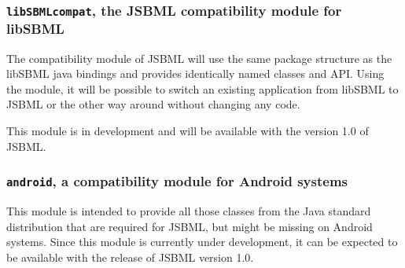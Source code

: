 \subsubsection{\texttt{libSBMLcompat}, the JSBML compatibility module for
libSBML}

The compatibility module of JSBML will use the same package structure as the
libSBML java bindings and provides identically named classes and API. Using the
module, it will be possible to switch an existing application from libSBML to
JSBML or the other way around without changing any code.

This module is in development and will be available with the version 1.0 of
JSBML.
%



\subsubsection{\texttt{android}, a compatibility module for Android systems}
This module is intended to provide all those classes from the Java\texttrademark{}
standard distribution that are required for JSBML, but might be missing on
Android systems. Since this module is currently under development, it can be
expected to be available with the release of JSBML version 1.0.
